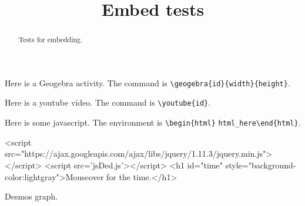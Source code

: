 \documentclass{ximera}
\title{Embed tests}
\begin{document}
	
\begin{abstract}
Tests for embedding.
\end{abstract}

\maketitle

Here is a Geogebra activity. The command is \verb!\geogebra{id}{width}{height}!.


Here is a youtube video. The command is \verb!\youtube{id}!.


Here is some javascript. The environment is \verb!\begin{html}! \verb!html_here!\verb!\end{html}!.

\begin{html}
<script src="https://ajax.googleapis.com/ajax/libs/jquery/1.11.3/jquery.min.js"></script>
<script src='jsDed.js'></script>
<h1 id="time" style="background-color:lightgray">Mouseover for the time.</h1>
\end{html}

Desmos graph.

\end{document}

